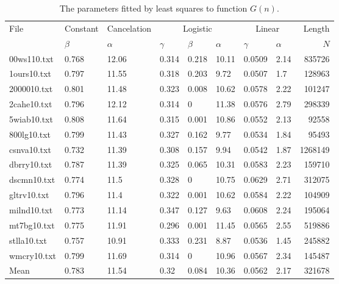 \documentclass[a4paper,12pt]{article}
\newcommand{\toprule}{\hline}
\newcommand{\midrule}{\hline}
\newcommand{\botrule}{\hline}
\begin{document}
\begin{table}[p]
  \caption{The parameters fitted by least squares to function
    $G(n)$.\label{tabPars}}
  \centering
  \medskip
  \footnotesize
  \begin{tabular}{|l|l|l|lll|ll|r|}
    \toprule
    File & Constant & Cancelation
    & \multicolumn{3}{c|}{Logistic}
    & \multicolumn{2}{c|}{Linear} & Length\\
    \cline{2-2}\cline{3-3}\cline{4-6}\cline{7-8}
    & $\beta$       & $\alpha$
    & $\gamma$      & $\beta$       & $\alpha$
    & $\gamma$      & $\alpha$      & $N$\\
\midrule
00ws110.txt     & 0.768 & 12.06 & 0.314 & 0.218 & 10.11 & 0.0509        & 2.14  & 835726\\
1ours10.txt     & 0.797 & 11.55 & 0.318 & 0.203 & 9.72  & 0.0507        & 1.7   & 128963\\
2000010.txt     & 0.801 & 11.48 & 0.323 & 0.008 & 10.62 & 0.0578        & 2.22  & 101247\\
2cahe10.txt     & 0.796 & 12.12 & 0.314 & 0     & 11.38 & 0.0576        & 2.79  & 298339\\
5wiab10.txt     & 0.808 & 11.64 & 0.315 & 0.001 & 10.86 & 0.0552        & 2.13  & 92558\\
800lg10.txt     & 0.799 & 11.43 & 0.327 & 0.162 & 9.77  & 0.0534        & 1.84  & 95493\\
csnva10.txt     & 0.732 & 11.39 & 0.308 & 0.157 & 9.94  & 0.0542        & 1.87  & 1268149\\
dbrry10.txt     & 0.787 & 11.39 & 0.325 & 0.065 & 10.31 & 0.0583        & 2.23  & 159710\\
dscmn10.txt     & 0.774 & 11.5  & 0.328 & 0     & 10.75 & 0.0629        & 2.71  & 312075\\
gltrv10.txt     & 0.796 & 11.4  & 0.322 & 0.001 & 10.62 & 0.0584        & 2.22  & 104909\\
milnd10.txt     & 0.773 & 11.14 & 0.347 & 0.127 & 9.63  & 0.0608        & 2.24  & 195064\\
mt7bg10.txt     & 0.775 & 11.91 & 0.296 & 0.001 & 11.45 & 0.0565        & 2.55  & 519886\\
stlla10.txt     & 0.757 & 10.91 & 0.333 & 0.231 & 8.87  & 0.0536        & 1.45  & 245882\\
wmcry10.txt     & 0.799 & 11.69 & 0.314 & 0     & 10.96 & 0.0567        & 2.34  & 145487\\
\midrule
Mean    & 0.783 & 11.54 & 0.32  & 0.084 & 10.36 & 0.0562        & 2.17  & 321678\\
\botrule
  \end{tabular}
\end{table}
\end{document}
